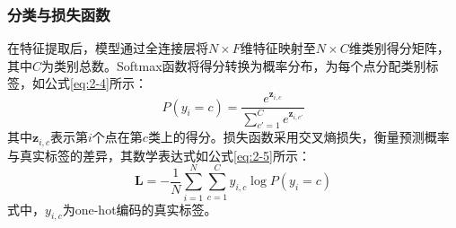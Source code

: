 \subsubsection{分类与损失函数}
在特征提取后，模型通过全连接层将$N \times F$维特征映射至$N \times C$维类别得分矩阵，其中$C$为类别总数。Softmax函数将得分转换为概率分布，为每个点分配类别标签，如公式\eqref{eq:2-4}所示：
\begin{equation}
    \label{eq:2-4}
    P(y_i=c) = \frac{e^{\mathbf{z}_{i,c}}}{\sum_{c'=1}^C e^{\mathbf{z}_{i,c'}}}
\end{equation}
其中$\mathbf{z}_{i,c}$表示第$i$个点在第$c$类上的得分。损失函数采用交叉熵损失，衡量预测概率与真实标签的差异，其数学表达式如公式\eqref{eq:2-5}所示：
\begin{equation}
    \label{eq:2-5}
    \mathbf{L} = -\frac{1}{N} \sum_{i=1}^N \sum_{c=1}^C y_{i,c} \log P(y_i=c)
\end{equation}
式中，$y_{i,c}$为one-hot编码的真实标签。%



